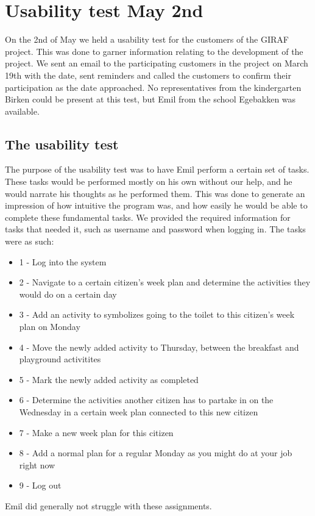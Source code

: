 \section{Usability test May 2nd}
On the 2nd of May we held a usability test for the customers of the GIRAF project.
This was done to garner information relating to the development of the project.
We sent an email to the participating customers in the project on March 19th with the date, sent reminders and called the customers to confirm their participation as the date approached.
No representatives from the kindergarten Birken could be present at this test, but Emil from the school Egebakken was available.

\subsection{The usability test}
The purpose of the usability test was to have Emil perform a certain set of tasks.
These tasks would be performed mostly on his own without our help, and he would narrate his thoughts as he performed them.
This was done to generate an impression of how intuitive the program was, and how easily he would be able to complete these fundamental tasks.
We provided the required information for tasks that needed it, such as username and password when logging in. 
The tasks were as such:
\begin{itemize}
    \item 1 - Log into the system
    \item 2 - Navigate to a certain citizen's week plan and determine the activities they would do on a certain day
    \item 3 - Add an activity to symbolizes going to the toilet to this citizen's week plan on Monday
    \item 4 - Move the newly added activity to Thursday, between the breakfast and playground activitites
    \item 5 - Mark the newly added activity as completed
    \item 6 - Determine the activities another citizen has to partake in on the Wednesday in a certain week plan connected to this new citizen
    \item 7 - Make a new week plan for this citizen
    \item 8 - Add a normal plan for a regular Monday as you might do at your job right now
    \item 9 - Log out 
\end{itemize}
\noindent
Emil did generally not struggle with these assignments.
